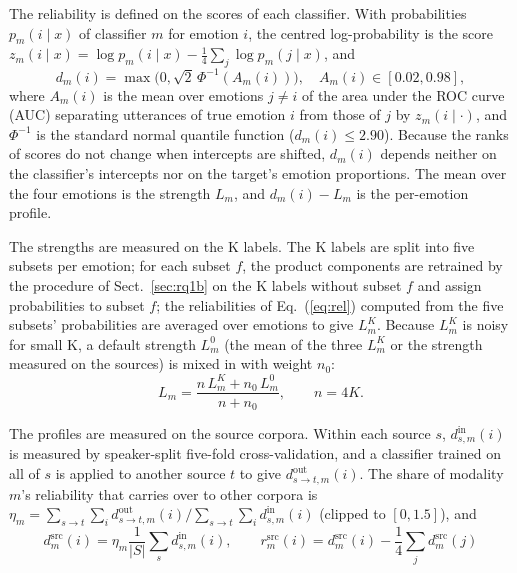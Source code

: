 The reliability is defined on the scores of each classifier. With probabilities $p_m(i\mid x)$ of classifier $m$ for emotion $i$, the centred log-probability is the score $z_m(i\mid x)=\log p_m(i\mid x)-\frac14\sum_j\log p_m(j\mid x)$, and
\begin{equation}\label{eq:rel}
d_m(i)=\max\!\big(0,\sqrt2\,\Phi^{-1}(A_m(i))\big),\quad A_m(i)\in[0.02,0.98],
\end{equation}
where $A_m(i)$ is the mean over emotions $j\neq i$ of the area under the ROC curve (AUC) separating utterances of true emotion $i$ from those of $j$ by $z_m(i\mid\cdot)$, and $\Phi^{-1}$ is the standard normal quantile function ($d_m(i)\le 2.90$). Because the ranks of scores do not change when intercepts are shifted, $d_m(i)$ depends neither on the classifier's intercepts nor on the target's emotion proportions. The mean over the four emotions is the strength $L_m$, and $d_m(i)-L_m$ is the per-emotion profile.

The strengths are measured on the K labels. The K labels are split into five subsets per emotion; for each subset $f$, the product components are retrained by the procedure of Sect.~\ref{sec:rq1b} on the K labels without subset $f$ and assign probabilities to subset $f$; the reliabilities of Eq.~(\ref{eq:rel}) computed from the five subsets' probabilities are averaged over emotions to give $L^{K}_m$. Because $L^{K}_m$ is noisy for small K, a default strength $L^{0}_m$ (the mean of the three $L^{K}_m$ or the strength measured on the sources) is mixed in with weight $n_0$:
\begin{equation}
L_m=\frac{n\,L^{K}_m+n_0\,L^{0}_m}{n+n_0},\qquad n=4K.
\end{equation}

The profiles are measured on the source corpora. Within each source $s$, $d^{\mathrm{in}}_{s,m}(i)$ is measured by speaker-split five-fold cross-validation, and a classifier trained on all of $s$ is applied to another source $t$ to give $d^{\mathrm{out}}_{s\to t,m}(i)$. The share of modality $m$'s reliability that carries over to other corpora is $\eta_m=\sum_{s\to t}\sum_i d^{\mathrm{out}}_{s\to t,m}(i)/\sum_{s\to t}\sum_i d^{\mathrm{in}}_{s,m}(i)$ (clipped to $[0,1.5]$), and
\begin{equation}
d^{\mathrm{src}}_m(i)=\eta_m\frac{1}{|S|}\sum_s d^{\mathrm{in}}_{s,m}(i),\qquad r^{\mathrm{src}}_m(i)=d^{\mathrm{src}}_m(i)-\frac14\sum_j d^{\mathrm{src}}_m(j)
\end{equation}


